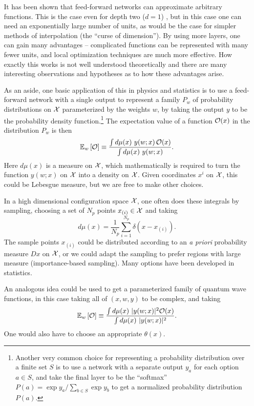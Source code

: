 \documentclass[12pt]{article}
\def\E#1#2{\mathbb{E}_{#1}\left[#2\right]}
\def\CO {{\cal O}}
\def\CX {{\cal X}}
\newcommand{\be}{\begin{equation}}
\newcommand{\ee}{\end{equation}}
\begin{document}
It has been shown that feed-forward networks can approximate arbitrary functions.
This is the case even for depth two ($d=1$) \cite{Cybenko}, but in this case one can need an exponentially
large number of units, as would be the case for simpler methods of interpolation (the ``curse of dimension'').
By using more layers, one can gain many advantages -- complicated functions can be represented with
many fewer units, and local optimization techniques are much more effective.  
How exactly this works is not
well understood theoretically and there are many interesting observations and hypotheses as to how these
advantages arise.

As an aside, one
basic application of this in physics and statistics is to use a feed-forward network with a single
output to represent a family $P_w$ of probability distributions on $\CX$ parameterized by the weights $w$,
by taking the output $y$ to be the probability density function.\footnote{
Another very common choice for representing a probability distribution over a finite set
$S$ is to use a network with a separate output $y_a$ for each option $a\in S$, and take the final layer
to be the ``softmax'' $P(a)=\exp y_a/\sum_{b\in S} \exp y_b$ to get a normalized probability distribution $P(a)$.}
The expectation value of a function $\CO(x)$ in the distribution $P_w$ is then
\be
\E{w}{\CO} \equiv \frac{ \int d\mu(x)\ y(w;x)\, \CO(x) }{ \int d\mu(x)\ y(w;x) } .
\ee
Here $d\mu(x)$ is a measure on $\CX$, which mathematically is required to turn the function $y(w;x)$ on $\CX$
into a density on $\CX$.  Given coordinates $x^i$ on $\CX$, this could be Lebesgue measure, but we are free
to make other choices.

In a high dimensional configuration space $\CX$, one often does these integrals by sampling,
choosing a set of $N_p$ points $x_{(i)}\in\CX$ and taking
\be
d\mu(x) = \frac{1}{N_p} \sum_{i=1}^{N_p} \delta(x-x_{(i)}) .
\ee
The sample points $x_{(i)}$ could be distributed 
according to an {\it a priori} probability measure $Dx$ on $\CX$, or we could
adapt the sampling to prefer regions with large measure (importance-based sampling).  Many options have been
developed in statistics.

An analogous idea could be used to get a parameterized family of quantum
wave functions, in this case taking all of $(x,w,y)$ to be complex, and taking
\be
\E{w}{\CO} \equiv \frac{ \int d\mu(x)\ |y(w;x)|^2 \CO(x) }{ \int d\mu(x)\ |y(w;x)|^2 } .
\ee
One would also have to choose an
appropriate $\theta(x)$.   %
\end{document}
